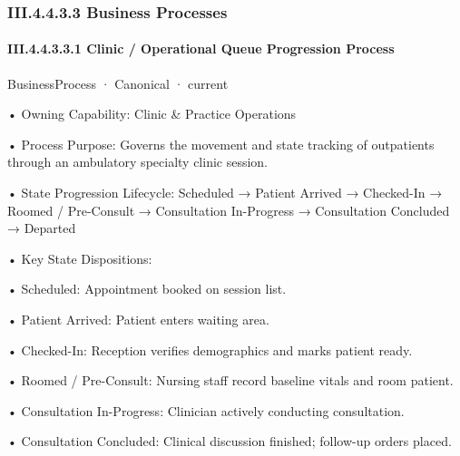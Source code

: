 \subsubsection*{III.4.4.3.3 Business Processes}
\label{navigation:III.4.4.3.3}

\paragraph*{III.4.4.3.3.1 Clinic / Operational Queue Progression Process}
\label{navigation:III.4.4.3.3.1}

\label{element:319d6956276a4cdeb43e350e1b01d078}
{\small BusinessProcess · Canonical · current}\par

•
Owning Capability: Clinic \& Practice Operations



•
Process Purpose: Governs the movement and state tracking of outpatients through an ambulatory specialty clinic session.



•
State Progression Lifecycle: Scheduled → Patient Arrived → Checked-In → Roomed / Pre-Consult → Consultation In-Progress → Consultation Concluded → Departed



•
Key State Dispositions:



•
Scheduled: Appointment booked on session list.



•
Patient Arrived: Patient enters waiting area.



•
Checked-In: Reception verifies demographics and marks patient ready.



•
Roomed / Pre-Consult: Nursing staff record baseline vitals and room patient.



•
Consultation In-Progress: Clinician actively conducting consultation.



•
Consultation Concluded: Clinical discussion finished; follow-up orders placed.




